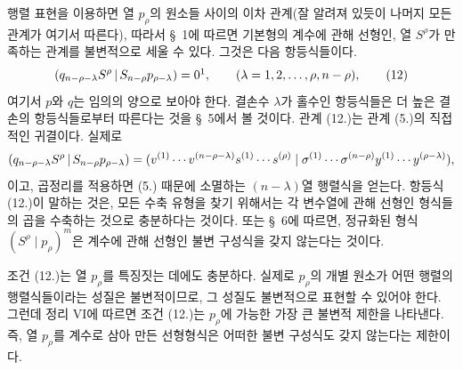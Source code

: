 행렬 표현을 이용하면 열 $p_\rho$의 원소들 사이의 이차 관계(잘 알려져 있듯이 나머지 모든 관계가 여기서 따른다), 따라서 \S\ 1에 따르면 기본형의 계수에 관해 선형인, 열 $S^\rho$가 만족하는 관계를 불변적으로 세울 수 있다. 그것은 다음 항등식들이다.
\begin{equation}
 \pair{q_{n-\rho-\lambda}S^\rho}{S_{n-\rho}p_{\rho-\lambda}}=0\footnotemark,
 \qquad (\lambda=1,2,\ldots,\rho,n-\rho),
\tag{12}
\end{equation}
여기서 $p$와 $q$는 임의의 양으로 보아야 한다. 결손수 $\lambda$가 홀수인 항등식들은 더 높은 결손의 항등식들로부터 따른다는 것을 \S\ 5에서 볼 것이다. 관계 (12.)는 관계 (5.)의 직접적인 귀결이다. 실제로
\[
 (q_{n-\rho-\lambda}S^\rho\,|\,S_{n-\rho}p_{\rho-\lambda})
 =(v^{(1)}\cdots v^{(n-\rho-\lambda)}s^{(1)}\cdots s^{(\rho)}\mid \sigma^{(1)}\cdots\sigma^{(n-\rho)}y^{(1)}\cdots y^{(\rho-\lambda)}),
\]
이고, 곱정리를 적용하면 (5.) 때문에 소멸하는 $(n-\lambda)$열 행렬식을 얻는다. 항등식 (12.)이 말하는 것은, 모든 수축 유형을 찾기 위해서는 각 변수열에 관해 선형인 형식들의 곱을 수축하는 것으로 충분하다는 것이다. 또는 \S\ 6에 따르면, 정규화된 형식 $(S^\rho\mid p_\rho)^m$은 계수에 관해 선형인 불변 구성식을 갖지 않는다는 것이다.

조건 (12.)는 열 $p_\rho$를 특징짓는 데에도 충분하다. 실제로 $p_\rho$의 개별 원소가 어떤 행렬의 행렬식들이라는 성질은 불변적이므로, 그 성질도 불변적으로 표현할 수 있어야 한다. 그런데 정리 VI에 따르면 조건 (12.)는 $p_\rho$에 가능한 가장 큰 불변적 제한을 나타낸다. 즉, 열 $p_\rho$를 계수로 삼아 만든 선형형식은 어떠한 불변 구성식도 갖지 않는다는 제한이다.

